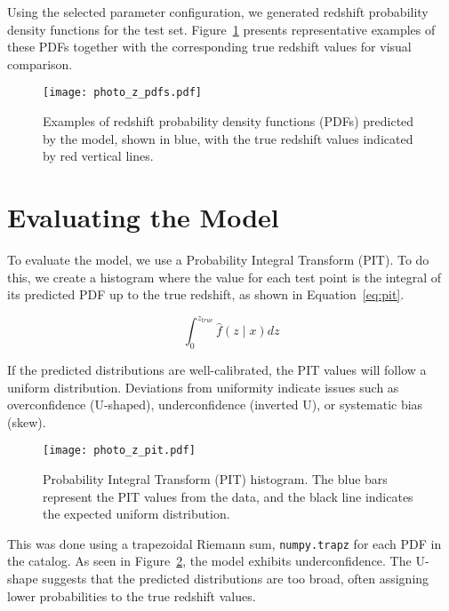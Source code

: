 \documentclass{article}
\begin{document}
Using the selected parameter configuration, we generated redshift probability density functions for the test set. Figure~\ref{fig:enter-label} presents representative examples of these PDFs together with the corresponding true redshift values for visual comparison.

\begin{figure}[H]
    \centering
    \texttt{[image: photo\_z\_pdfs.pdf]}
    \caption{Examples of redshift probability density functions (PDFs) predicted by the model, shown in blue, with the true redshift values indicated by red vertical lines.}
    \label{fig:enter-label}
\end{figure}

\section*{Evaluating the Model}

To evaluate the model, we use a Probability Integral Transform (PIT). To do this, we create a histogram where the value for each test point is the integral of its predicted PDF up to the true redshift, as shown in Equation~\ref{eq:pit}.

\begin{equation}
    \int_{0}^{z_{true}}{\hat{f}(z \mid x)dz}
    \label{eq:pit}
\end{equation}

If the predicted distributions are well-calibrated, the PIT values will follow a uniform distribution. Deviations from uniformity indicate issues such as overconfidence (U-shaped), underconfidence (inverted U), or systematic bias (skew).

\begin{figure}[H]
    \centering
    \texttt{[image: photo\_z\_pit.pdf]}
    \caption{Probability Integral Transform (PIT) histogram. The blue bars represent the PIT values from the data, and the black line indicates the expected uniform distribution.}
    \label{fig:pit}
\end{figure}

This was done using a trapezoidal Riemann sum, \texttt{numpy.trapz} for each PDF in the catalog. As seen in Figure~\ref{fig:pit}, the model exhibits underconfidence. The U-shape suggests that the predicted distributions are too broad, often assigning lower probabilities to the true redshift values.
\end{document}
